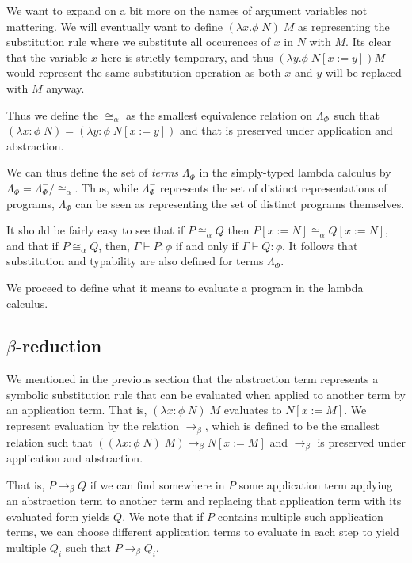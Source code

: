 \documentclass[12pt]{article}
\begin{document}
We want to expand on a bit more on the names of argument variables not mattering. 
We will eventually want to define $(\lambda x.\phi\; N)\; M$ as representing 
the substitution rule where we substitute all occurences of $x$ in $N$ with $M$. 
Its clear that the variable $x$ here is strictly temporary, and thus 
$(\lambda y.\phi\;N[x:=y]) M$ would represent the same substitution operation
as both $x$ and $y$ will be replaced with $M$ anyway. 

Thus we define the $\cong_\alpha$ as the smallest equivalence relation on $\Lambda_\Phi^-$
such that $(\lambda x:\phi\; N) = (\lambda y:\phi\; N[x:=y])$ 
and that is preserved under application and abstraction. 

We can thus define the set of \textit{terms} $\Lambda_\Phi$ in the simply-typed lambda calculus
by $\Lambda_\Phi=\Lambda_\Phi^-/\cong_\alpha$. 
Thus, while $\Lambda_\Phi^-$ represents the set of distinct representations of programs,
$\Lambda_\Phi$ can be seen as representing the set of distinct programs themselves. 

It should be fairly easy to see that if $P\cong_\alpha Q$ then $P[x:=N]\cong_\alpha Q[x:=N]$,
and that if $P \cong_\alpha Q$, then, $\Gamma\vdash P:\phi$ if and only if $\Gamma\vdash Q:\phi$. 
It follows that substitution and typability are also defined for terms $\Lambda_\Phi$.  

We proceed to define what it means to evaluate a program in the lambda calculus. 

\subsection{$\beta$-reduction}
We mentioned in the previous section that the abstraction term represents 
a symbolic substitution rule that can be evaluated when applied to another term
by an application term. 
That is, $(\lambda x:\phi\; N)\; M$ evaluates to $N[x:=M]$. 
We represent evaluation by the relation $\to_\beta$, 
which is defined to be the smallest relation such that
$((\lambda x:\phi\; N)\; M)\to_\beta N[x:=M]$ and $\to_\beta$ 
is preserved under application and abstraction. 

That is, $P\to_\beta Q$ if we can find somewhere in $P$ some application term
applying an abstraction term to another term and replacing that application term
with its evaluated form yields $Q$. 
We note that if $P$ contains multiple such application terms, 
we can choose different application terms to evaluate in each step 
to yield multiple $Q_i$ such that $P\to_\beta Q_i$. 
\end{document}
